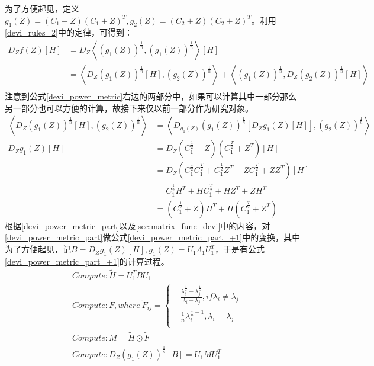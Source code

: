 为了方便起见，定义$g_{1}(Z)=(C_1+Z)(C_1+Z)^{T},g_{2}(Z)=(C_2+Z)(C_2+Z)^{T}$。利用\ref{devi_rules_2}中的定律，可得到：
\begin{equation}
\label{devi_power_metric}
\begin{split}
D_{Z}f(Z)[H]&=D_{Z}\left<\left(g_{1}(Z)\right)^{\frac{1}{n}},\left(g_{1}(Z)\right)^{\frac{1}{n}}\right>[H]\\
&=\left<D_{Z}\left(g_{1}(Z)\right)^{\frac{1}{n}}[H],\left(g_{2}(Z)\right)^{\frac{1}{n}}\right>+\left<\left(g_{1}(Z)\right)^{\frac{1}{n}},D_{Z}\left(g_{2}(Z)\right)^{\frac{1}{n}}[H]\right>\\
\end{split}
\end{equation}
注意到公式\ref{devi_power_metric}右边的两部分中，如果可以计算其中一部分那么另一部分也可以方便的计算，故接下来仅以前一部分作为研究对象。
\begin{equation}
\label{devi_power_metric_part}
\begin{split}
\left<D_{Z}\left(g_{1}(Z)\right)^{\frac{1}{n}}[H],\left(g_{2}(Z)\right)^{\frac{1}{n}}\right>&=\left<D_{g_{1}(Z)}\left(g_{1}(Z)\right)^{\frac{1}{n}}[D_{Z}g_{1}(Z)[H]],\left(g_{2}(Z)\right)^{\frac{1}{n}}\right>\\
D_{Z}g_{1}(Z)[H]&=D_{Z}(C_{1}^{\frac{1}{2}}+Z)(C_{1}^{\frac{T}{2}}+Z^{T})[H]\\
&=D_{Z}(C_{1}^{\frac{1}{2}}C_{1}^{\frac{T}{2}}+C_{1}^{\frac{1}{2}}Z^{T}+ZC_{1}^{\frac{T}{2}}+ZZ^{T})[H]\\
&=C_{1}^{\frac{1}{2}}H^{T}+HC_{1}^{\frac{T}{2}}+HZ^{T}+ZH^{T}\\
&=(C_{1}^{\frac{1}{2}}+Z)H^{T}+H(C_{1}^{\frac{T}{2}}+Z^{T})
\end{split}
\end{equation}
根据\ref{devi_power_metric_part}以及\ref{sec:matrix_func_devi}中的内容，对\ref{devi_power_metric_part}做公式\ref{devi_power_metric_part_+1}中的变换，其中为了方便起见，记$B=D_{Z}g_{1}(Z)[H],g_{1}(Z)=U_{1}\Lambda_{1}U_{1}^{T}$，于是有公式\ref{devi_power_metric_part_+1}的计算过程。
\begin{equation}
\label{devi_power_metric_part_+1}
\begin{split}
&Compute:\tilde{H}=U_{1}^{T}BU_{1}\\
&Compute:\tilde{F},where~\tilde{F}_{ij}=\left\{
\begin{split}
&\frac{\lambda_{i}^{\frac{1}{n}}-\lambda_{j}^{\frac{1}{n}}}{\lambda_{i}-\lambda_{j}},if \lambda_{i}\neq \lambda_{j}\\
&\frac{1}{n}\lambda_{i}^{\frac{1}{n}-1},\lambda_{i}=\lambda_{j}\\
\end{split}
\right.\\
&Compute:M=\tilde{H}\odot\tilde{F}\\
&Compute:D_{Z}\left(g_{1}(Z)\right)^{\frac{1}{n}}[B]=U_{1}MU_{1}^{T}
\end{split}
\end{equation}
